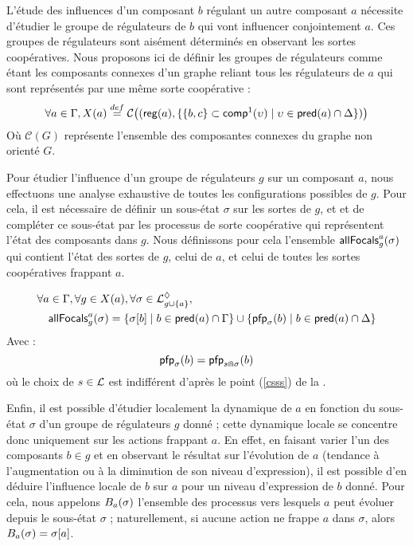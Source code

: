 L'étude des influences d'un composant $b$ régulant un autre composant $a$ nécessite d'étudier
le groupe de régulateurs de $b$ qui vont influencer conjointement $a$.
Ces groupes de régulateurs sont aisément déterminés en observant les sortes coopératives.
Nous proposons ici de définir les groupes de régulateurs comme étant les composants connexes
d'un graphe reliant tous les régulateurs de $a$ qui sont représentés par une même sorte
coopérative :
\[
  \forall a \in \mathrm{\Gamma},
  X(a) \stackrel{def}= \mathcal{C} \big( (\mathsf{reg}(a),
  \{ \{b,c\} \subset \mathsf{comp}^1(\upsilon) \mid
  \upsilon \in \mathsf{pred}(a) \cap \Delta \}) \big)
\]
Où $\mathcal{C}(G)$ représente l'ensemble des composantes connexes du graphe non orienté $G$.

Pour étudier l'influence d'un groupe de régulateurs $g$ sur un composant $a$,
nous effectuons une analyse exhaustive de toutes les configurations possibles de $g$.
Pour cela, il est nécessaire de définir un sous-état $\sigma$ sur les sortes de $g$,
et et de compléter ce sous-état par les processus de sorte coopérative
qui représentent l'état des composants dans $g$.
Nous définissons pour cela l'ensemble $\mathsf{allFocals}^{a}_{g}(\sigma)$
qui contient l'état des sortes de $g$, celui de $a$, et celui de toutes les sortes
coopératives frappant $a$.

\begin{align*}
  &\forall a \in \mathrm{\Gamma}, \forall g \in X(a), \forall \sigma \in \mathcal{L}^\lozenge_{g \cup \{ a \}}, \\
  & \quad
  \mathsf{allFocals}^{a}_{g}(\sigma) = \{ {\sigma[b]} \mid b \in \mathsf{pred}(a) \cap \mathrm{\Gamma} \}
  \cup \{ \mathsf{pfp}_\sigma(b) \mid b \in \mathsf{pred}(a) \cap \Delta \}
\end{align*}
Avec :
\[
  \mathsf{pfp}_\sigma(b) = \mathsf{pfp}_{s \Cap \sigma}(b)
\]
où le choix de $s \in \mathcal{L}$ est indifférent d'après le point (\ref{csss}) de la .

Enfin, il est possible d'étudier localement la dynamique de $a$ en fonction du sous-état
$\sigma$ d'un groupe de régulateurs $g$ donné ;
cette dynamique locale se concentre donc uniquement sur les actions frappant $a$.
En effet, en faisant varier l'un des composants $b \in g$ et en observant le résultat
sur l'évolution de $a$ (tendance à l'augmentation ou à la diminution de son niveau d'expression),
il est possible d'en déduire l'influence locale de $b$ sur $a$ pour un niveau d'expression
de $b$ donné.
Pour cela, nous appelons $B_a(\sigma)$ l'ensemble des processus vers lesquels $a$ peut évoluer
depuis le sous-état $\sigma$ ;
naturellement, si aucune action ne frappe $a$ dans $\sigma$,
alors $B_a(\sigma) = {\sigma[a]}$.

